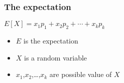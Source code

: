 
\subsubsection{The expectation}
$E[X]=x_1p_1 + x_2p_2+ \cdots +x_kp_k$

\begin{itemize}
\item $E$ is the expectation
\item $X$ is a random variable
\item $x_1$,$x_2$,\ldots,$x_k$ are possible value of $X$
\end{itemize}
